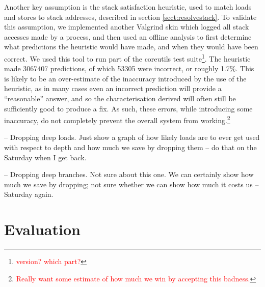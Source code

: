 \documentclass[10pt,twocolumn,preprint,natbib,authoryear]{sigplanconf}
\newcommand{\editorial}[1]{\textcolor{red}{\footnote{\textcolor{red}{#1}}}}
\begin{document}
Another key assumption is the stack satisfaction heuristic, used to
match loads and stores to stack addresses, described in section
\ref{sect:resolvestack}.  To validate this assumption, we implemented
another Valgrind skin which logged all stack accesses made by a
process, and then used an offline analysis to first determine what
predictions the heuristic would have made, and when they would have
been correct.  We used this tool to run part of the coreutils test
suite\editorial{version? which part?}.  The heuristic made 3067407
predictions, of which 53305 were incorrect, or roughly 1.7\%.  This is
likely to be an over-estimate of the inaccuracy introduced by the use
of the heuristic, as in many cases even an incorrect prediction will
provide a ``reasonable'' answer, and so the characterisation derived
will often still be sufficiently good to produce a fix.  As such,
these errors, while introducing some inaccuracy, do not completely
prevent the overall system from working.\editorial{Really want some
  estimate of how much we win by accepting this badness.}

-- Dropping deep loads.  Just show a graph of how likely loads are to
ever get used with respect to depth and how much we save by dropping
them -- do that on the Saturday when I get back.

-- Dropping deep branches.  Not sure about this one.  We can certainly
show how much we save by dropping; not sure whether we can show how
much it costs us -- Saturday again.

\section{Evaluation}
\end{document}
